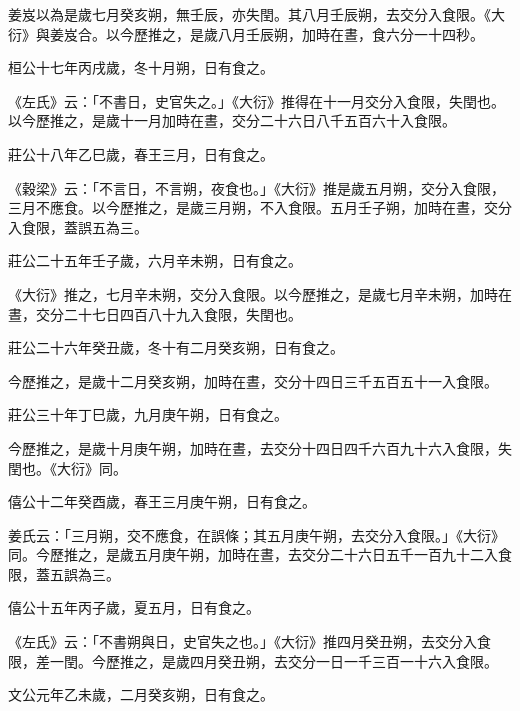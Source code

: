 \begin{pinyinscope}
 姜岌以為是歲七月癸亥朔，無壬辰，亦失閏。其八月壬辰朔，去交分入食限。《大衍》與姜岌合。以今歷推之，是歲八月壬辰朔，加時在晝，食六分一十四秒。



 桓公十七年丙戌歲，冬十月朔，日有食之。



 《左氏》云：「不書日，史官失之。」《大衍》推得在十一月交分入食限，失閏也。以今歷推之，是歲十一月加時在晝，交分二十六日八千五百六十入食限。



 莊公十八年乙巳歲，春王三月，日有食之。



 《穀梁》云：「不言日，不言朔，夜食也。」《大衍》推是歲五月朔，交分入食限，三月不應食。以今歷推之，是歲三月朔，不入食限。五月壬子朔，加時在晝，交分入食限，蓋誤五為三。



 莊公二十五年壬子歲，六月辛未朔，日有食之。



 《大衍》推之，七月辛未朔，交分入食限。以今歷推之，是歲七月辛未朔，加時在晝，交分二十七日四百八十九入食限，失閏也。



 莊公二十六年癸丑歲，冬十有二月癸亥朔，日有食之。



 今歷推之，是歲十二月癸亥朔，加時在晝，交分十四日三千五百五十一入食限。



 莊公三十年丁巳歲，九月庚午朔，日有食之。



 今歷推之，是歲十月庚午朔，加時在晝，去交分十四日四千六百九十六入食限，失閏也。《大衍》同。



 僖公十二年癸酉歲，春王三月庚午朔，日有食之。



 姜氏云：「三月朔，交不應食，在誤條；其五月庚午朔，去交分入食限。」《大衍》同。今歷推之，是歲五月庚午朔，加時在晝，去交分二十六日五千一百九十二入食限，蓋五誤為三。



 僖公十五年丙子歲，夏五月，日有食之。



 《左氏》云：「不書朔與日，史官失之也。」《大衍》推四月癸丑朔，去交分入食限，差一閏。今歷推之，是歲四月癸丑朔，去交分一日一千三百一十六入食限。



 文公元年乙未歲，二月癸亥朔，日有食之。




\end{pinyinscope}
